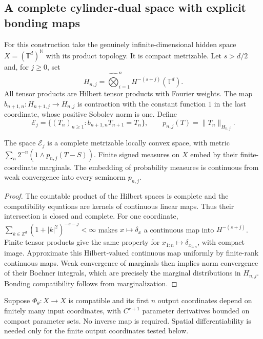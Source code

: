 \subsection{A complete cylinder-dual space with explicit bonding maps}

For this construction take the genuinely infinite-dimensional hidden space
$X=(\mathbb T^d)^{\mathbb N}$ with its product topology.  It is compact
metrizable.  Let $s>d/2$ and, for $j\ge0$, set
\[
 H_{n,j}=\widehat\bigotimes_{i=1}^n H^{-(s+j)}(\mathbb T^d).
\]
All tensor products are Hilbert tensor products with Fourier weights.
The map $b_{n+1,n}:H_{n+1,j}\to H_{n,j}$ is contraction with the constant
function $1$ in the last coordinate, whose positive Sobolev norm is one.
Define
\[
 \mathscr E_j=
 \{(T_n)_{n\ge1}:b_{n+1,n}T_{n+1}=T_n\},
 \qquad p_{n,j}(T)=\|T_n\|_{H_{n,j}}.
\]

\begin{proposition}
\label{prop:r33-c1-projective}
The space $\mathscr E_j$ is a complete metrizable locally convex space, with
metric $\sum_n2^{-n}(1\wedge p_{n,j}(T-S))$.  Finite signed measures on $X$
embed by their finite-coordinate marginals.  The embedding of probability
measures is continuous from weak convergence into every seminorm $p_{n,j}$.
\end{proposition}
\begin{proof}
The countable product of the Hilbert spaces is complete and the compatibility
equations are kernels of continuous linear maps.  Thus their intersection is
closed and complete.  For one coordinate,
$\sum_{k\in\mathbb Z^d}(1+|k|^2)^{-s-j}<\infty$ makes $x\mapsto\delta_x$
a continuous map into $H^{-(s+j)}$.  Finite tensor products give the same
property for $x_{1:n}\mapsto\delta_{x_{1:n}}$, with compact image.  Approximate
this Hilbert-valued continuous map uniformly by finite-rank continuous maps.
Weak convergence of marginals then implies norm convergence of their Bochner
integrals, which are precisely the marginal distributions in $H_{n,j}$.
Bonding compatibility follows from marginalization.
\end{proof}

Suppose $\Phi_\theta:X\to X$ is compatible and its first $n$ output
coordinates depend on finitely many input coordinates, with $C^{r+1}$
parameter derivatives bounded on compact parameter sets.  No inverse map is
required.  Spatial differentiability is needed only for the finite output
coordinates tested below.

